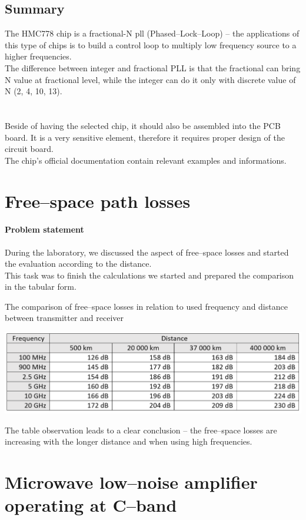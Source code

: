 \documentclass[eng,printmode]{mgr}
\begin{document}
\section{Summary}
The HMC778 chip is a fractional-N pll (Phased--Lock--Loop) -- the applications of this type of chips is to build a control loop to multiply low frequency source to a higher frequencies.\\
The difference between integer and fractional PLL is that the fractional can bring N value at fractional level, while the integer can do it only with discrete value of N (2, 4, 10, 13).\\
\\
\\
Beside of having the selected chip, it should also be assembled into the PCB board. It is a very sensitive element, therefore it requires proper design of the circuit board.\\ The chip's official documentation contain relevant examples and informations.

\chapter{Free--space path losses}
\subsubsection{Problem statement}
During the laboratory, we discussed the aspect of free--space losses and started the evaluation according to the distance.\\
This task was to finish the calculations we started and prepared the comparison in the tabular form.

\begin{table}[h]
	\centering
	\caption{The comparison of free--space losses in relation to used frequency and distance between transmitter and receiver}
	\includegraphics[width=0.9\linewidth]{freespace}
	\label{fig:freespace}
\end{table}
\noindent
The table observation leads to a clear conclusion -- the free--space losses are increasing with the longer distance and when using high frequencies.
\newpage
\chapter{Microwave low--noise amplifier operating at C--band}
\end{document}

